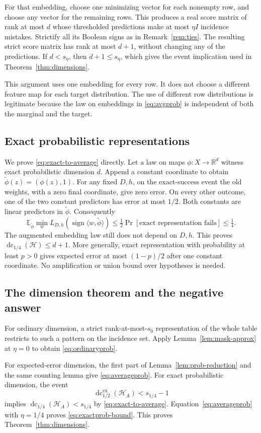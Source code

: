 \documentclass[11pt,letterpaper,pmlr,twoside]{jmlr}
\newcommand{\Hc}{\mathcal H}
\newcommand{\E}{\mathbb E}
\newcommand{\R}{\mathbb R}
\newcommand{\sgn}{\operatorname{sign}}
\newcommand{\dc}{\operatorname{dc}}
\newcommand{\edc}{\operatorname{dc}^{\mathrm{ex}}_{1/2}}
\newcommand{\err}{L}
\newcommand{\ip}[2]{\langle #1,#2\rangle}
\begin{document}
For that embedding, choose one minimizing vector for each nonempty row, and choose any vector for the remaining rows. This produces a real score matrix of rank at most $d$ whose thresholded predictions make at most $\eta I$ incidence mistakes. Strictify all its Boolean signs as in Remark~\ref{rem:ties}. The resulting strict score matrix has rank at most $d+1$, without changing any of the predictions. If $d<s_\eta$, then $d+1\le s_\eta$, which gives the event implication used in Theorem~\ref{thm:dimensions}.

This argument uses one embedding for every row. It does not choose a different feature map for each target distribution. The use of different row distributions is legitimate because the law on embeddings in \eqref{eq:avgprob} is independent of both the marginal and the target.

\subsection{Exact probabilistic representations}
We prove \eqref{eq:exact-to-average} directly. Let a law on maps $\phi:X\to\R^d$ witness exact probabilistic dimension $d$. Append a constant coordinate to obtain $\widetilde\phi(z)=(\phi(z),1)$. For any fixed $D,h$, on the exact-success event the old weights, with a zero final coordinate, give zero error. On every other outcome, one of the two constant predictors has error at most $1/2$. Both constants are linear predictors in $\widetilde\phi$. Consequently
\[
 \E_{\widetilde\phi}\min_w
 \err_{D,h}(\sgn\ip{w}{\widetilde\phi})
 \le \tfrac12\Pr[\text{exact representation fails}]
 \le\tfrac14.
\]
The augmented embedding law still does not depend on $D,h$. This proves $\dc_{1/4}(\Hc)\le d+1$. More generally, exact representation with probability at least $p>0$ gives expected error at most $(1-p)/2$ after one constant coordinate. No amplification or union bound over hypotheses is needed.

\subsection{The dimension theorem and the negative answer}
For ordinary dimension, a strict rank-at-most-$s_0$ representation of the whole table restricts to such a pattern on the incidence set. Apply Lemma~\ref{lem:mask-approx} at $\eta=0$ to obtain \eqref{eq:ordinaryprob}.

For expected-error dimension, the first part of Lemma~\ref{lem:prob-reduction} and the same counting lemma give \eqref{eq:averageprob}. For exact probabilistic dimension, the event
\[
 \edc(\Hc_A)<s_{1/4}-1
\]
implies $\dc_{1/4}(\Hc_A)<s_{1/4}$ by \eqref{eq:exact-to-average}. Equation~\eqref{eq:averageprob} with $\eta=1/4$ proves \eqref{eq:exactprob-bound}. This proves Theorem~\ref{thm:dimensions}.
\end{document}
